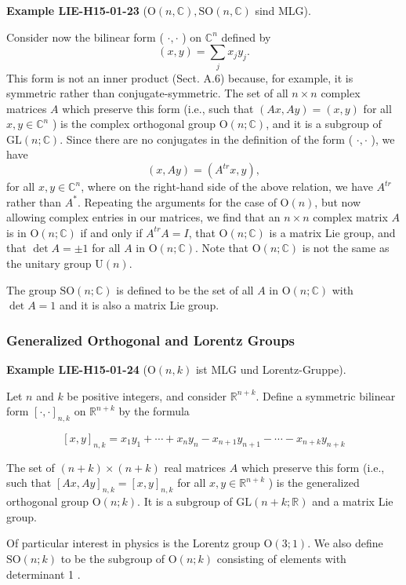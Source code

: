 \documentclass[10pt, letterpaper]{article}
\newcommand{\C}{\mathbb{C}}
\newcommand{\SO}{\mathrm{SO}}
\newcommand{\Ogroup}{\mathrm{O}} %
\newcommand{\CustomHeading}[3]{%
  \par\medskip\noindent%
  \textbf{#1 #2} \textnormal{(#3)}.\enskip%
}
\newenvironment{EXA}[2]{\begin{unitbox}\CustomHeading{Example}{#1}{#2}}{\end{unitbox}}
\begin{document}
\begin{EXA}{LIE-H15-01-23}{$\Ogroup(n,\C), \SO(n,\C)$ sind MLG}
Consider now the bilinear form ( $\cdot, \cdot$ ) on $\mathbb{C}^{n}$ defined by
$$
(x, y)=\sum_{j} x_{j} y_{j} .
$$
This form is not an inner product (Sect. A.6) because, for example, it is symmetric rather than conjugate-symmetric. The set of all $n \times n$ complex matrices $A$ which preserve this form (i.e., such that $(A x, A y)=(x, y)$ for all $x, y \in \mathbb{C}^{n}$ ) is the complex orthogonal group $\mathrm{O}(n ; \mathbb{C})$, and it is a subgroup of $\mathrm{GL}(n ; \mathbb{C})$. Since there are no conjugates in the definition of the form ( $\cdot, \cdot$ ), we have
$$
(x, A y)=\left(A^{t r} x, y\right),
$$
for all $x, y \in \mathbb{C}^{n}$, where on the right-hand side of the above relation, we have $A^{t r}$ rather than $A^{*}$. Repeating the arguments for the case of $\mathrm{O}(n)$, but now allowing complex entries in our matrices, we find that an $n \times n$ complex matrix $A$ is in $\mathrm{O}(n ; \mathbb{C})$ if and only if $A^{t r} A=I$, that $\mathrm{O}(n ; \mathbb{C})$ is a matrix Lie group, and that $\operatorname{det} A= \pm 1$ for all $A$ in $\mathrm{O}(n ; \mathbb{C})$. Note that $\mathrm{O}(n ; \mathbb{C})$ is not the same as the unitary group $\mathrm{U}(n)$. 

The group $\mathrm{SO}(n ; \mathbb{C})$ is defined to be the set of all $A$ in $\mathrm{O}(n ; \mathbb{C})$ with $\operatorname{det} A=1$ and it is also a matrix Lie group.
\end{EXA}



\subsubsection*{Generalized Orthogonal and Lorentz Groups}




\begin{EXA}{LIE-H15-01-24}{$\Ogroup(n,k)$ ist MLG und Lorentz-Gruppe}
Let $n$ and $k$ be positive integers, and consider $\mathbb{R}^{n+k}$. Define a symmetric bilinear form $[\cdot, \cdot]_{n, k}$ on $\mathbb{R}^{n+k}$ by the formula

$$
[x, y]_{n, k}=x_{1} y_{1}+\cdots+x_{n} y_{n}-x_{n+1} y_{n+1}-\cdots-x_{n+k} y_{n+k}
$$

The set of $(n+k) \times(n+k)$ real matrices $A$ which preserve this form (i.e., such that $[A x, A y]_{n, k}=[x, y]_{n, k}$ for all $x, y \in \mathbb{R}^{n+k}$ ) is the generalized orthogonal group $\mathrm{O}(n ; k)$. It is a subgroup of $\mathrm{GL}(n+k ; \mathbb{R})$ and a matrix Lie group.


Of particular interest in physics is the Lorentz group $\mathrm{O}(3 ; 1)$. We also define $\mathrm{SO}(n ; k)$ to be the subgroup of $\mathrm{O}(n ; k)$ consisting of elements with determinant 1 .
\end{EXA}
\end{document}
